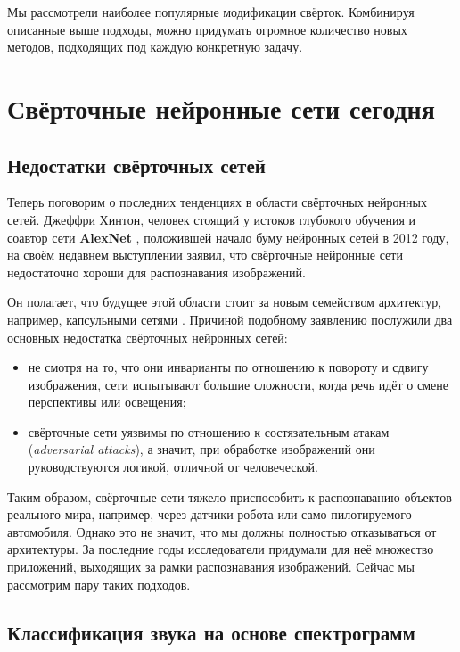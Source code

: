 \documentclass[12pt, fleqn]{article}
\begin{document}
    Мы рассмотрели наиболее популярные модификации свёрток. Комбинируя описанные выше подходы,
    можно придумать огромное количество новых методов, подходящих под каждую конкретную задачу.

    \section{Свёрточные нейронные сети сегодня}

    \subsection{Недостатки свёрточных сетей}

    Теперь поговорим о последних тенденциях в области свёрточных нейронных сетей. Джеффри Хинтон, человек стоящий у 
    истоков глубокого обучения и соавтор сети \textbf{AlexNet} \cite{krizhevsky2012imagenet}, положившей начало 
    буму нейронных сетей в 2012 году, на своём недавнем выступлении \cite{cnn_uncool} заявил, что свёрточные нейронные 
    сети недостаточно хороши для распознавания изображений.

    Он полагает, что будущее этой области стоит за новым семейством архитектур, например, капсульными сетями \cite{sabour2017dynamic}. 
    Причиной подобному заявлению послужили два основных недостатка свёрточных нейронных сетей:
    \begin{itemize}
        \item не смотря на то, что они инварианты по отношению к повороту и сдвигу изображения, сети испытывают 
        большие сложности, когда речь идёт о смене перспективы или освещения;
        \item свёрточные сети уязвимы по отношению к состязательным атакам (\textit{adversarial attacks}), а значит, 
        при обработке изображений они руководствуются логикой, отличной от человеческой.
    \end{itemize}

    Таким образом, свёрточные сети тяжело приспособить к распознаванию объектов реального мира, например, через 
    датчики робота или само пилотируемого автомобиля. Однако это не значит, что мы должны полностью отказываться от 
    архитектуры. За последние годы исследователи придумали для неё множество приложений, выходящих за рамки распознавания 
    изображений. Сейчас мы рассмотрим пару таких подходов.

    \subsection{Классификация звука на основе спектрограмм}
\end{document}
